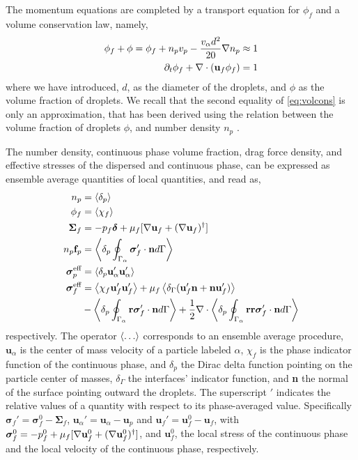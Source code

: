 The momentum equations are completed by a transport equation for $\phi_f$ and a volume conservation law, namely, 
\begin{align}
    \label{eq:volcons}
    \phi_f+\phi= \phi_f + n_pv_p  - \frac{v_\alpha d^2 }{20}\grad n_p \approx 1\\
    \pddt \phi_f + \div (\textbf{u}_f \phi_f)= 1
\end{align}
where we have introduced, $d$, as the diameter of the droplets, and $\phi$ as the volume fraction of droplets. 
We recall that the second equality of \ref{eq:volcons} is only an approximation, that has been derived using the relation between the volume fraction of droplets $\phi$, and number density $n_p$ \citep{zhang1997momentum}. 

The number density, continuous phase volume fraction, drag force density, and effective stresses of the dispersed and continuous phase, can be expressed as ensemble average quantities of local quantities, and read as, 
\begin{align}
    n_p &= \pavg{}
    \label{eq:n_p}\\
    \phi_f &= \avg{\chi_f}
    \label{eq:chi_f}\\
    \bm\Sigma_f &= - p_f \bm\delta + \mu_f [\grad \textbf{u}_f +  (\grad \textbf{u}_f)^\dagger ] 
    \label{eq:sigma_f}\\
    n_p \textbf{f}_p  &= \pSavg{\bm\sigma'_f\cdot \textbf{n}}
    \label{eq:f_alpha}
    \\
    \bm{\sigma}_p^{\text{eff}} &= \pavg{\textbf{u}_\alpha'\textbf{u}_\alpha'}
    \label{eq:def_uup}
    \\
    \bm{\sigma}^{\text{eff}}_f 
    &= \avg{\chi_f \textbf{u}_f'\textbf{u}_f'} 
    + \mu_f \avg{\delta_\Gamma (\textbf{u}_f' \textbf{n}+ \textbf{n}\textbf{u}_f')} \nonumber \\
    &- \pSavg{\textbf{r}\bm\sigma'_f\cdot \textbf{n}}
    + \frac{1}{2}\div\pSavg{\textbf{rr}\bm\sigma'_f\cdot \textbf{n}}
    \label{eq:def_sigma_eff_f}
\end{align}
respectively. 
The operator $\left<\ldots\right>$ corresponds to an ensemble average procedure, 
$\textbf{u}_\alpha$ is the center of mass velocity of a particle labeled $\alpha$, $\chi_f$ is the phase indicator function of the continuous phase, and $\delta_p$ the Dirac delta function pointing on the particle center of masses, $\delta_\Gamma$ the interfaces' indicator function, and \textbf{n} the normal of the surface pointing outward the droplets. 
The superscript $'$ indicates the relative values of a quantity with respect to its phase-averaged value. 
Specifically $\bm{\sigma}_f' = \bm{\sigma}_f^0  - \bm{\Sigma}_f$, 
$\textbf{u}_\alpha' = \textbf{u}_\alpha - \textbf{u}_p$ and $\textbf{u}_f' = \textbf{u}_f^0  -\textbf{u}_f$, with $\bm{\sigma}_f^0 = -p_f^0 + \mu_f [\mathbf{\nabla} \textbf{u}_f^0 + (\mathbf{\nabla} \textbf{u}_f^0)^\dagger] $, and $\textbf{u}_f^0$, the local stress of the continuous phase and the local velocity of the continuous phase, respectively. 

